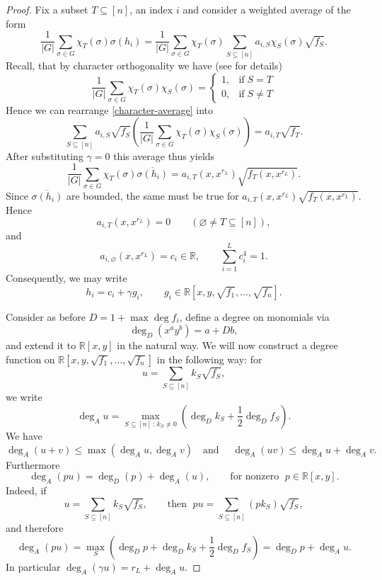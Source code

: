 \documentclass[12pt,reqno]{amsart}   	%
\theoremstyle{remark}
\newcommand{\R}{\mathbb{R}}
\newcommand{\brac}[1]{\left ( #1 \right )}
\begin{document}
\begin{proof}
    Fix a subset $T\subseteq[n]$, an index $i$ and consider a weighted average of the form
    \begin{equation}
    \frac{1}{|G|}\sum_{\sigma\in G} \chi_T(\sigma)\sigma(h_i) = \frac{1}{|G|}\sum_{\sigma\in G} \chi_T(\sigma)\sum_{S\subseteq[n]}a_{i,S}\chi_S(\sigma)\sqrt{f_S}.
        \label{character-average}
    \end{equation}
    Recall, that by character orthogonality we have (see \cite{kowalski2021} for details)
    \[
    \frac{1}{|G|} \sum_{\sigma\in G} \chi_T(\sigma)\chi_S(\sigma) = 
    \begin{cases}
    1,& \text{if}\;S=T \\
    0,& \text{if}\;S\neq T
    \end{cases}
    \]
    Hence we can rearrange \eqref{character-average} into
    \[
    \sum_{S\subseteq[n]}a_{i,S}\sqrt{f_S}\brac{\frac{1}{|G|} \sum_{\sigma\in G} \chi_T(\sigma)\chi_S(\sigma)} = a_{i,T}\sqrt{f_T}.
    \]
    After substituting $\gamma=0$ this average thus yields
    \[
    \frac{1}{|G|}\sum_{\sigma\in G} \chi_T(\sigma)\overline{\sigma(h_i)} = a_{i,T}(x,x^{r_L}) \sqrt{f_T(x,x^{r_L})}.
    \]
    Since $\overline{\sigma (h_i)}$ are bounded, the same must be true for $a_{i,T}(x,x^{r_L}) \sqrt{f_T(x,x^{r_L})}$. Hence
    \[
        a_{i,T}(x,x^{r_L})=0 \qquad(\varnothing\neq T\subseteq[n]),
    \]
    and
    \[
            a_{i,\varnothing}(x,x^{r_L})=c_i\in\mathbb R,\qquad \sum_{i=1}^L c_i^4 =1 .
    \]
    Consequently, we may write
    \[
    h_i = c_i+\gamma g_i,\qquad g_i\in \R[x,y,\sqrt{f_1},\dots, \sqrt{f_n}].
    \]

    Consider as before $D = 1+\max\deg f_i$, define a degree on monomials via
    \[
    \deg_D(x^ay^b) = a+Db,
    \]
    and extend it to $\R[x,y]$ in the natural way. We will now construct a degree function on $\R[x,y,\sqrt{f_1},\dots, \sqrt{f_n}]$ in the following way: for
    \[
    u = \sum_{S\subseteq[n]}k_{S}\sqrt{f_S},
    \]
    we write
    \[
    \deg_A u = \max_{S\subseteq[n]\,:\, k_S\neq0}\brac{ \deg_D k_S + \frac{1}{2}\deg_D f_S}.
    \]
    We have
    \[
    \deg_A(u+v)\leq \max(\deg_A u,\deg_A v)\quad\text{and }\quad \deg_A(uv)\leq \deg_A u+\deg_A v  .
    \]
    Furthermore
    \[
    \deg_A(pu) = \deg_D(p) + \deg_A(u),\qquad\text{for nonzero }\; p\in\R[x,y].
    \]
    Indeed, if
    \[
    u =  \sum_{S\subseteq[n]} k_S\sqrt{f_S},\qquad\text{then }\; pu = \sum_{S\subseteq[n]} (pk_S)\sqrt{f_S},
    \]
    and therefore
    \[
    \deg_A(pu)=\max_S(\deg_Dp+\deg_D k_S+\frac12 \deg_D f_S)=\deg_D p+\deg_A u.
    \]
    In particular $\deg_A(\gamma u) = r_L + \deg_A u$.


\end{proof}
\end{document}
